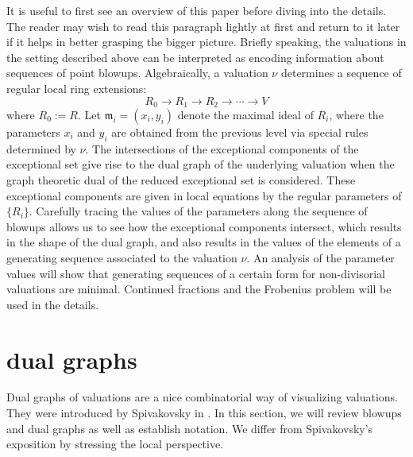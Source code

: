 \documentclass[11pt]{amsart}
\theoremstyle{definition}
\begin{document}
It is useful to first see an overview of this paper before diving into the details. The reader may wish to read this paragraph lightly at first and return to it later if it helps in better grasping the bigger picture. Briefly speaking, the valuations in the setting described above can be interpreted as encoding information about sequences of point blowups. Algebraically, a valuation $\nu$ determines a sequence of regular local ring extensions:
$$R_0\rightarrow R_1\rightarrow R_2 \rightarrow \cdots \rightarrow V$$
where $R_0:=R$. Let $\mathfrak{m}_i=(x_i,y_i)$ denote the maximal ideal of $R_i$, where the parameters $x_i$ and $y_i$ are obtained from the previous level via special rules determined by $\nu$. The intersections of the exceptional components of the exceptional set give rise to the dual graph of the underlying valuation when the graph theoretic dual of the reduced exceptional set is considered. These exceptional components are given in local equations by the regular parameters of $\{R_i\}$. Carefully tracing the values of the parameters along the sequence of blowups allows us to see how the exceptional components intersect, which results in the shape of the dual graph, and also results in the values of the elements of a generating sequence associated to the valuation $\nu$. An analysis of the parameter values will show that generating sequences of a certain form for non-divisorial valuations are minimal. Continued fractions and the Frobenius problem will be used in the details.

\section{dual graphs} \label{sectdg}

Dual graphs of valuations are a nice combinatorial way of visualizing valuations. They were introduced by Spivakovsky in \cite{spiv}. In this section, we will review blowups and dual graphs as well as establish notation. We differ from Spivakovsky's exposition by stressing the local perspective.
\end{document}
